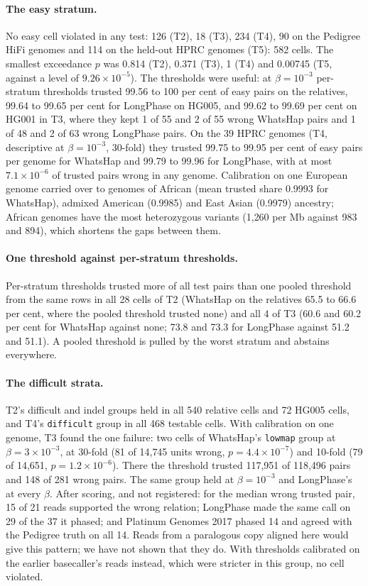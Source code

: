 \documentclass[11pt]{article}
\theoremstyle{definition}
\theoremstyle{remark}
\begin{document}
\paragraph{The easy stratum.} No easy cell violated in any test: 126 (T2),
18 (T3), 234 (T4), 90 on the Pedigree HiFi genomes and 114 on the held-out
HPRC genomes (T5): 582 cells. The smallest exceedance $p$ was 0.814 (T2),
0.371 (T3), 1 (T4) and 0.00745 (T5, against a level of $9.26\times10^{-5}$). The thresholds were useful: at $\beta=10^{-3}$
per-stratum thresholds trusted 99.56 to 100 per cent of easy pairs on the
relatives, 99.64 to 99.65 per cent for LongPhase on HG005, and 99.62 to
99.69 per cent on HG001 in T3, where they kept 1 of 55 and 2 of 55 wrong
WhatsHap pairs and 1 of 48 and 2 of 63 wrong LongPhase pairs. On the 39
HPRC genomes (T4, descriptive at $\beta=10^{-3}$, 30-fold) they trusted
99.75 to 99.95 per cent of easy pairs per genome for WhatsHap and 99.79 to
99.96 for LongPhase, with at most $7.1\times10^{-6}$ of trusted pairs wrong in
any genome. Calibration on one European genome carried over to genomes of
African (mean trusted share 0.9993 for WhatsHap), admixed American (0.9985)
and East Asian (0.9979) ancestry; African genomes have the most
heterozygous variants (1{,}260 per Mb against 983 and 894), which shortens
the gaps between them.

\paragraph{One threshold against per-stratum thresholds.} Per-stratum
thresholds trusted more of all test pairs than one pooled threshold from
the same rows in all 28 cells of T2 (WhatsHap on the relatives 65.5 to
66.6 per cent, where the pooled threshold trusted none) and all 4 of T3
(60.6 and 60.2 per cent for WhatsHap against none; 73.8 and 73.3 for
LongPhase against 51.2 and 51.1). A pooled threshold is pulled by the
worst stratum and abstains everywhere.

\paragraph{The difficult strata.} T2's difficult and indel groups held in
all 540 relative cells and 72 HG005 cells, and T4's \texttt{difficult}
group in all 468 testable cells. With calibration on one genome, T3 found
the one failure: two cells of
WhatsHap's \texttt{lowmap} group at $\beta=3\times10^{-3}$, at 30-fold (81 of
14{,}745 units wrong, $p=4.4\times10^{-7}$) and 10-fold (79 of 14{,}651,
$p=1.2\times10^{-6}$). There the threshold trusted 117{,}951 of 118{,}496
pairs and 148 of 281 wrong pairs. The same group held at $\beta=10^{-3}$
and LongPhase's at every $\beta$. After scoring, and not registered: for the
median wrong trusted pair, 15 of 21 reads supported the wrong relation;
LongPhase made the same call on 29 of the 37 it phased; and Platinum
Genomes 2017 phased 14 and agreed with the Pedigree truth on all 14. Reads
from a paralogous copy aligned here would give this pattern; we have not
shown that they do. With thresholds calibrated on the earlier basecaller's
reads instead, which were stricter in this group, no cell violated.
\end{document}
